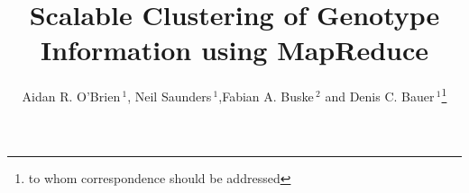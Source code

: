 \documentclass{bioinfo}
\begin{document}

	
\newcommand{\OnePhaseone}{phase1\_chr1}
\newcommand{\NinteenPhaseone}{phase1\_chr19}
\newcommand{\SevenPhaseone}{phase1\_chr1-7}
\newcommand{\FullPhaseone}{phase1\_chr1-22}
\newcommand{\OnePhasethree}{phase3\_chr1}
\newcommand{\ThreePhasethree}{phase3\_chr1-3}
\newcommand{\FullPhasethree}{phase3\_chr1-22}
\newcommand{\ARI}{Adjusted Rand Index}

\title[MapReduce Clustering]{Scalable Clustering of Genotype Information using MapReduce}
\author[O'Brien \textit{et~al}]{Aidan R. O'Brien\,$^{1}$, Neil Saunders\,$^1$,Fabian A. Buske\,$^{2}$ and Denis C. Bauer\,$^1$\footnote{to whom correspondence should be addressed}}
\address{$^{1}$CSIRO, Digital Productivity Flagship, 11 Julius Av, 2113, Sydney, Australia\\
$^{2}$Cancer Epigenetics Program, Cancer Research Division, Kinghorn Cancer Centre, Garvan Institute of Medical Research, 384 Victoria St, 2010, Sydney, Australia}



\maketitle
\end{document}
